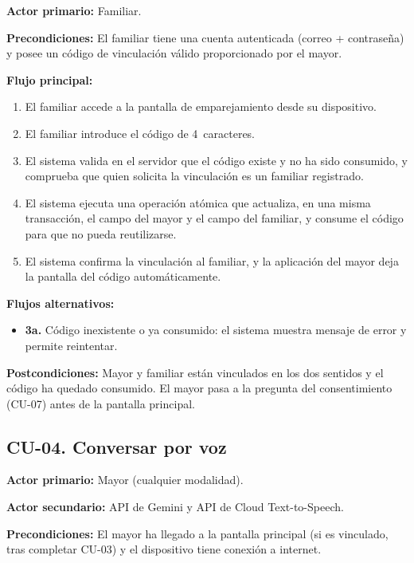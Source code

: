 \noindent\textbf{Actor primario:} Familiar.

\noindent\textbf{Precondiciones:} El familiar tiene una cuenta autenticada (correo + contraseña) y posee un código de vinculación válido proporcionado por el mayor.

\noindent\textbf{Flujo principal:}
\begin{enumerate}[nosep]
    \item El familiar accede a la pantalla de emparejamiento desde su dispositivo.
    \item El familiar introduce el código de 4~caracteres.
    \item El sistema valida en el servidor que el código existe y no ha sido consumido, y comprueba que quien solicita la vinculación es un familiar registrado.
    \item El sistema ejecuta una operación atómica que actualiza, en una misma transacción, el campo  del mayor y el campo  del familiar, y consume el código para que no pueda reutilizarse.
    \item El sistema confirma la vinculación al familiar, y la aplicación del mayor deja la pantalla del código automáticamente.
\end{enumerate}

\noindent\textbf{Flujos alternativos:}
\begin{itemize}[nosep]
    \item \textbf{3a.} Código inexistente o ya consumido: el sistema muestra mensaje de error y permite     reintentar.
\end{itemize}

\noindent\textbf{Postcondiciones:} Mayor y familiar están vinculados en los dos sentidos y el código ha quedado consumido. El mayor pasa a la pregunta del consentimiento (CU-07) antes de la pantalla principal.

\bigskip

\subsection*{CU-04. Conversar por voz}

\noindent\textbf{Actor primario:} Mayor (cualquier modalidad).

\noindent\textbf{Actor secundario:} API de Gemini y API de Cloud Text-to-Speech.

\noindent\textbf{Precondiciones:} El mayor ha llegado a la pantalla principal (si es vinculado, tras completar CU-03) y el dispositivo tiene conexión a internet.

